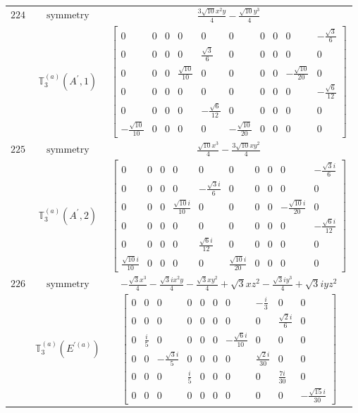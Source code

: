 \documentclass[fleqn,8pt,landscape]{jsarticle}
\begin{document}
\begin{longtable}{ccc}
$ 224 $ & $ \text{symmetry} $ & $ \frac{3 \sqrt{10} x^{2} y}{4} - \frac{\sqrt{10} y^{3}}{4} $ \\
$  $ & $ \mathbb{T}_{3}^{(a)}(A^{\prime},1) $ & $ \begin{bmatrix} 0 & 0 & 0 & 0 & 0 & 0 & 0 & 0 & 0 & - \frac{\sqrt{3}}{6} \\ 0 & 0 & 0 & 0 & \frac{\sqrt{3}}{6} & 0 & 0 & 0 & 0 & 0 \\ 0 & 0 & 0 & \frac{\sqrt{10}}{10} & 0 & 0 & 0 & 0 & - \frac{\sqrt{10}}{20} & 0 \\ 0 & 0 & 0 & 0 & 0 & 0 & 0 & 0 & 0 & - \frac{\sqrt{6}}{12} \\ 0 & 0 & 0 & 0 & - \frac{\sqrt{6}}{12} & 0 & 0 & 0 & 0 & 0 \\ - \frac{\sqrt{10}}{10} & 0 & 0 & 0 & 0 & - \frac{\sqrt{10}}{20} & 0 & 0 & 0 & 0 \end{bmatrix} $ \\ \hline
$ 225 $ & $ \text{symmetry} $ & $ \frac{\sqrt{10} x^{3}}{4} - \frac{3 \sqrt{10} x y^{2}}{4} $ \\
$  $ & $ \mathbb{T}_{3}^{(a)}(A^{\prime},2) $ & $ \begin{bmatrix} 0 & 0 & 0 & 0 & 0 & 0 & 0 & 0 & 0 & - \frac{\sqrt{3} i}{6} \\ 0 & 0 & 0 & 0 & - \frac{\sqrt{3} i}{6} & 0 & 0 & 0 & 0 & 0 \\ 0 & 0 & 0 & \frac{\sqrt{10} i}{10} & 0 & 0 & 0 & 0 & - \frac{\sqrt{10} i}{20} & 0 \\ 0 & 0 & 0 & 0 & 0 & 0 & 0 & 0 & 0 & - \frac{\sqrt{6} i}{12} \\ 0 & 0 & 0 & 0 & \frac{\sqrt{6} i}{12} & 0 & 0 & 0 & 0 & 0 \\ \frac{\sqrt{10} i}{10} & 0 & 0 & 0 & 0 & \frac{\sqrt{10} i}{20} & 0 & 0 & 0 & 0 \end{bmatrix} $ \\ \hline
$ 226 $ & $ \text{symmetry} $ & $ - \frac{\sqrt{3} x^{3}}{4} - \frac{\sqrt{3} i x^{2} y}{4} - \frac{\sqrt{3} x y^{2}}{4} + \sqrt{3} x z^{2} - \frac{\sqrt{3} i y^{3}}{4} + \sqrt{3} i y z^{2} $ \\
$  $ & $ \mathbb{T}_{3}^{(a)}(E^{\prime(a)}) $ & $ \begin{bmatrix} 0 & 0 & 0 & 0 & 0 & 0 & 0 & - \frac{i}{3} & 0 & 0 \\ 0 & 0 & 0 & 0 & 0 & 0 & 0 & 0 & \frac{\sqrt{2} i}{6} & 0 \\ 0 & \frac{i}{5} & 0 & 0 & 0 & 0 & - \frac{\sqrt{6} i}{10} & 0 & 0 & 0 \\ 0 & 0 & - \frac{\sqrt{3} i}{5} & 0 & 0 & 0 & 0 & \frac{\sqrt{2} i}{30} & 0 & 0 \\ 0 & 0 & 0 & \frac{i}{5} & 0 & 0 & 0 & 0 & \frac{7 i}{30} & 0 \\ 0 & 0 & 0 & 0 & 0 & 0 & 0 & 0 & 0 & - \frac{\sqrt{15} i}{30} \end{bmatrix} $ \\ \hline

\end{longtable}
\end{document}
